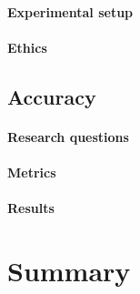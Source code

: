 \paragraph{Experimental setup}
\paragraph{Ethics}
\subsection{Accuracy}

\paragraph{Research questions}
\paragraph{Metrics}
\paragraph{Results}



\section{Summary}
